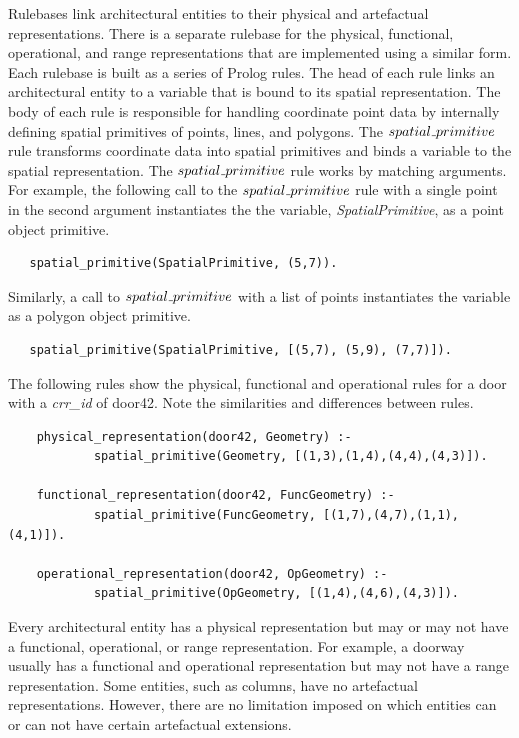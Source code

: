\documentclass[12pt]{ucthesis}
\begin{document}
Rulebases link architectural entities to their physical and artefactual representations. There is a separate rulebase for the physical, functional, operational, and range representations that are implemented using a similar form. Each rulebase is built as a series of Prolog rules. The head of each rule links an architectural entity to a variable that is bound to its spatial representation. The body of each rule is responsible for handling coordinate point data by internally defining spatial primitives of points, lines, and polygons. The $spatial \mathunderscore primitive$ rule transforms coordinate data into spatial primitives and binds a variable to the spatial representation. The $spatial \mathunderscore primitive$ rule works by matching arguments. For example, the following call to the $spatial \mathunderscore primitive$ rule with a single point in the second argument instantiates the the variable, \emph{SpatialPrimitive}, as a point object primitive.
\begin{verbatim}
   spatial_primitive(SpatialPrimitive, (5,7)).
\end{verbatim} Similarly, a call to $spatial \mathunderscore primitive$ with a list of points instantiates the variable as a polygon object primitive.
\begin{verbatim}
   spatial_primitive(SpatialPrimitive, [(5,7), (5,9), (7,7)]).
\end{verbatim} 

The following rules show the physical, functional and operational rules for a door with a \emph{crr\_id} of door42. Note the similarities and differences between rules.
\begin{verbatim}
    physical_representation(door42, Geometry) :-
            spatial_primitive(Geometry, [(1,3),(1,4),(4,4),(4,3)]).
            
    functional_representation(door42, FuncGeometry) :-
            spatial_primitive(FuncGeometry, [(1,7),(4,7),(1,1),(4,1)]).
            
    operational_representation(door42, OpGeometry) :-
            spatial_primitive(OpGeometry, [(1,4),(4,6),(4,3)]).
\end{verbatim} Every architectural entity has a physical representation but may or may not have a functional, operational, or range representation. For example, a doorway usually has a functional and operational representation but may not have a range representation. Some entities, such as columns, have no artefactual representations. However, there are no limitation imposed on which entities can or can not have certain artefactual extensions.
\end{document}
